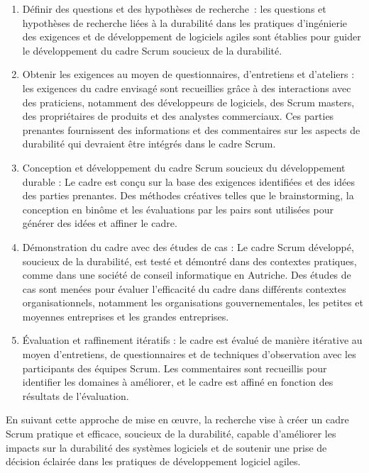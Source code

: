 \begin{enumerate}
    \item Définir des questions et des hypothèses de recherche : les questions et hypothèses de recherche liées à la durabilité dans les pratiques d'ingénierie des exigences et de développement de logiciels agiles sont établies pour guider le développement du cadre Scrum soucieux de la durabilité.
    \item Obtenir les exigences au moyen de questionnaires, d'entretiens et d'ateliers : les exigences du cadre envisagé sont recueillies grâce à des interactions avec des praticiens, notamment des développeurs de logiciels, des Scrum masters, des propriétaires de produits et des analystes commerciaux. Ces parties prenantes fournissent des informations et des commentaires sur les aspects de durabilité qui devraient être intégrés dans le cadre Scrum.
    \item Conception et développement du cadre Scrum soucieux du développement durable : Le cadre est conçu sur la base des exigences identifiées et des idées des parties prenantes. Des méthodes créatives telles que le brainstorming, la conception en binôme et les évaluations par les pairs sont utilisées pour générer des idées et affiner le cadre.
    \item Démonstration du cadre avec des études de cas : Le cadre Scrum développé, soucieux de la durabilité, est testé et démontré dans des contextes pratiques, comme dans une société de conseil informatique en Autriche. Des études de cas sont menées pour évaluer l'efficacité du cadre dans différents contextes organisationnels, notamment les organisations gouvernementales, les petites et moyennes entreprises et les grandes entreprises.
    \item Évaluation et raffinement itératifs : le cadre est évalué de manière itérative au moyen d'entretiens, de questionnaires et de techniques d'observation avec les participants des équipes Scrum. Les commentaires sont recueillis pour identifier les domaines à améliorer, et le cadre est affiné en fonction des résultats de l'évaluation.
\end{enumerate}

En suivant cette approche de mise en œuvre, la recherche vise à créer un cadre Scrum pratique et efficace, soucieux de la durabilité, capable d'améliorer les impacts sur la durabilité des systèmes logiciels et de soutenir une prise de décision éclairée dans les pratiques de développement logiciel agiles.

